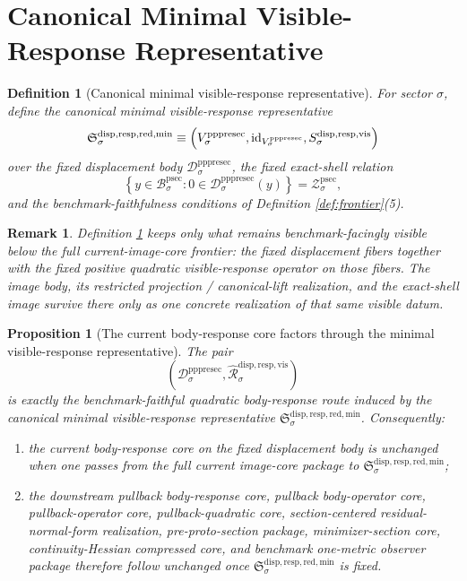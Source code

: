 \documentclass[11pt]{article}
\newcommand{\ProtoSectionBody}[1]{\mathcal B_{#1}^{\mathrm{psec}}}
\newcommand{\ProtoSectionShell}[1]{\mathcal Z_{#1}^{\mathrm{psec}}}
\newcommand{\PrePreProtoSectionVertical}[1]{V_{#1}^{\mathrm{pppresec}}}
\newcommand{\PrePreProtoSectionResidualBody}[1]{\mathcal D_{#1}^{\mathrm{pppresec}}}
\newcommand{\CoreForcedBodyResponse}[1]{\widehat{\mathscr R}_{#1}^{\mathrm{disp,resp,vis}}}
\newcommand{\VisibleResponseOperator}[1]{S_{#1}^{\mathrm{disp,resp,vis}}}
\newcommand{\MinimalReducedStructure}{\mathfrak S^{\mathrm{disp,resp,red,min}}}
\newtheorem{definition}{Definition}
\newtheorem{proposition}{Proposition}
\newtheorem{remark}{Remark}
\begin{document}
\section{Canonical Minimal Visible-Response Representative}

\begin{definition}[Canonical minimal visible-response representative]
\label{def:minimal}
For sector \(\sigma\), define the \emph{canonical minimal visible-response representative}
\[
\MinimalReducedStructure_{\sigma}
\equiv
\Bigl(
\PrePreProtoSectionVertical{\sigma},
\mathrm{id}_{\PrePreProtoSectionVertical{\sigma}},
\VisibleResponseOperator{\sigma}
\Bigr)
\]
over the fixed displacement body \(\PrePreProtoSectionResidualBody{\sigma}\), the fixed exact-shell relation
\[
\left\{
y\in\ProtoSectionBody{\sigma}:0\in\PrePreProtoSectionResidualBody{\sigma}(y)
\right\}
=
\ProtoSectionShell{\sigma},
\]
and the benchmark-faithfulness conditions of Definition \ref{def:frontier}(5).
\end{definition}

\begin{remark}
Definition \ref{def:minimal} keeps only what remains benchmark-facingly visible below the full current-image-core frontier: the fixed displacement fibers together with the fixed positive quadratic visible-response operator on those fibers. The image body, its restricted projection / canonical-lift realization, and the exact-shell image survive there only as one concrete realization of that same visible datum.
\end{remark}

\begin{proposition}[The current body-response core factors through the minimal visible-response representative]
\label{prop:downstream}
The pair
\[
\left(
\PrePreProtoSectionResidualBody{\sigma},
\CoreForcedBodyResponse{\sigma}
\right)
\]
is exactly the benchmark-faithful quadratic body-response route induced by the canonical minimal visible-response representative \(\MinimalReducedStructure_{\sigma}\). Consequently:
\begin{enumerate}
    \item the current body-response core on the fixed displacement body is unchanged when one passes from the full current image-core package to \(\MinimalReducedStructure_{\sigma}\);
    \item the downstream pullback body-response core, pullback body-operator core, pullback-operator core, pullback-quadratic core, section-centered residual-normal-form realization, pre-proto-section package, minimizer-section core, continuity-Hessian compressed core, and benchmark one-metric observer package therefore follow unchanged once \(\MinimalReducedStructure_{\sigma}\) is fixed.
\end{enumerate}
\end{proposition}
\end{document}
